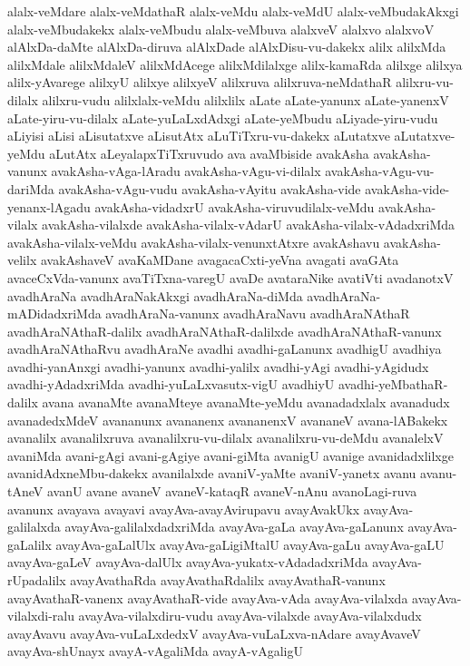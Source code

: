{alalx-veMdare
alalx-veMdathaR
alalx-veMdu
alalx-veMdU
alalx-veMbudakAkxgi
alalx-veMbudakekx
alalx-veMbudu
alalx-veMbuva
alalxveV
alalxvo
alalxvoV
alAlxDa-daMte
alAlxDa-diruva
alAlxDade
alAlxDisu-vu-dakekx
alilx
alilxMda
alilxMdale
alilxMdaleV
alilxMdAcege
alilxMdilalxge
alilx-kamaRda
alilxge
alilxya
alilx-yAvarege
alilxyU
alilxye
alilxyeV
alilxruva
alilxruva-neMdathaR
alilxru-vu-dilalx
alilxru-vudu
alilxlalx-veMdu
alilxlilx
aLate
aLate-yanunx
aLate-yanenxV
aLate-yiru-vu-dilalx
aLate-yuLaLxdAdxgi
aLate-yeMbudu
aLiyade-yiru-vudu
aLiyisi
aLisi
aLisutatxve
aLisutAtx
aLuTiTxru-vu-dakekx
aLutatxve
aLutatxve-yeMdu
aLutAtx
aLeyalapxTiTxruvudo
ava
avaMbiside
avakAsha
avakAsha-vanunx
avakAsha-vAga-lAradu
avakAsha-vAgu-vi-dilalx
avakAsha-vAgu-vu-dariMda
avakAsha-vAgu-vudu
avakAsha-vAyitu
avakAsha-vide
avakAsha-vide-yenanx-lAgadu
avakAsha-vidadxrU
avakAsha-viruvudilalx-veMdu
avakAsha-vilalx
avakAsha-vilalxde
avakAsha-vilalx-vAdarU
avakAsha-vilalx-vAdadxriMda
avakAsha-vilalx-veMdu
avakAsha-vilalx-venunxtAtxre
avakAshavu
avakAsha-velilx
avakAshaveV
avaKaMDane
avagacaCxti-yeVna
avagati
avaGAta
avaceCxVda-vanunx
avaTiTxna-varegU
avaDe
avataraNike
avatiVti
avadanotxV
avadhAraNa
avadhAraNakAkxgi
avadhAraNa-diMda
avadhAraNa-mADidadxriMda
avadhAraNa-vanunx
avadhAraNavu
avadhAraNAthaR
avadhAraNAthaR-dalilx
avadhAraNAthaR-dalilxde
avadhAraNAthaR-vanunx
avadhAraNAthaRvu
avadhAraNe
avadhi
avadhi-gaLanunx
avadhigU
avadhiya
avadhi-yanAnxgi
avadhi-yanunx
avadhi-yalilx
avadhi-yAgi
avadhi-yAgidudx
avadhi-yAdadxriMda
avadhi-yuLaLxvasutx-vigU
avadhiyU
avadhi-yeMbathaR-dalilx
avana
avanaMte
avanaMteye
avanaMte-yeMdu
avanadadxlalx
avanadudx
avanadedxMdeV
avananunx
avananenx
avananenxV
avananeV
avana-lABakekx
avanalilx
avanalilxruva
avanalilxru-vu-dilalx
avanalilxru-vu-deMdu
avanalelxV
avaniMda
avani-gAgi
avani-gAgiye
avani-giMta
avanigU
avanige
avanidadxlilxge
avanidAdxneMbu-dakekx
avanilalxde
avaniV-yaMte
avaniV-yanetx
avanu
avanu-tAneV
avanU
avane
avaneV
avaneV-kataqR
avaneV-nAnu
avanoLagi-ruva
avanunx
avayava
avayavi
avayAva-avayAvirupavu
avayAvakUkx
avayAva-galilalxda
avayAva-galilalxdadxriMda
avayAva-gaLa
avayAva-gaLanunx
avayAva-gaLalilx
avayAva-gaLalUlx
avayAva-gaLigiMtalU
avayAva-gaLu
avayAva-gaLU
avayAva-gaLeV
avayAva-dalUlx
avayAva-yukatx-vAdadadxriMda
avayAva-rUpadalilx
avayAvathaRda
avayAvathaRdalilx
avayAvathaR-vanunx
avayAvathaR-vanenx
avayAvathaR-vide
avayAva-vAda
avayAva-vilalxda
avayAva-vilalxdi-ralu
avayAva-vilalxdiru-vudu
avayAva-vilalxde
avayAva-vilalxdudx
avayAvavu
avayAva-vuLaLxdedxV
avayAva-vuLaLxva-nAdare
avayAvaveV
avayAva-shUnayx
avayA-vAgaliMda
avayA-vAgaligU
}
